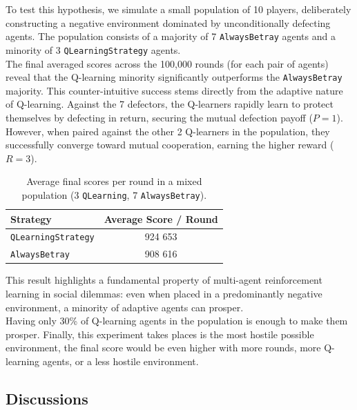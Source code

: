 \documentclass[11pt, a4paper]{article}
\begin{document}
To test this hypothesis, we simulate a small population of 10 players, deliberately constructing a negative environment dominated by unconditionally defecting agents. The population consists of a majority of 7 \texttt{AlwaysBetray} agents and a minority of 3 \texttt{QLearningStrategy} agents. \\

The final averaged scores across the 100,000 rounds (for each pair of agents) reveal that the Q-learning minority significantly outperforms the \texttt{AlwaysBetray} majority. This counter-intuitive success stems directly from the adaptive nature of Q-learning. Against the 7 defectors, the Q-learners rapidly learn to protect themselves by defecting in return, securing the mutual defection payoff ($P=1$). However, when paired against the other 2 Q-learners in the population, they successfully converge toward mutual cooperation, earning the higher reward ($R=3$). \\

\begin{table}[H]
  \centering
  \caption{Average final scores per round in a mixed population (3 \texttt{QLearning}, 7 \texttt{AlwaysBetray}).}
  \label{tab:population_scores}
  \begin{tabular}{lc}
    \toprule
    \textbf{Strategy} & \textbf{Average Score / Round} \\
    \midrule
    \texttt{QLearningStrategy} & 924 653  \\
    \texttt{AlwaysBetray}      & 908 616 \\
    \bottomrule
  \end{tabular}
\end{table}


This result highlights a fundamental property of multi-agent reinforcement learning in social dilemmas: even when placed in a predominantly negative environment, a minority of adaptive agents can prosper.\\

Having only 30\% of Q-learning agents in the population is enough to make them prosper. Finally, this experiment takes places is the most hostile possible environment, the final score would be even higher with more rounds, more Q-learning agents, or a less hostile environment. \\
\newpage
\subsection{Discussions}
\label{sec:discussions}
\end{document}
